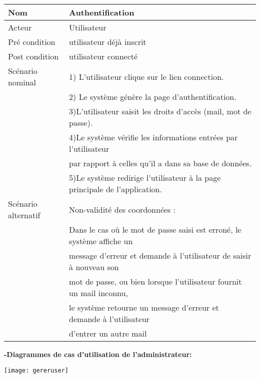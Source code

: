\documentclass[a4paper,12pt,oneside]{report}
\begin{document}
\begin{center}

\begin{tabular}{|l|l|}
  \hline
  Nom & Authentification \\
  \hline
  Acteur & Utilisateur  \\
  \hline
  Pré condition & utilisateur déjà inscrit\\
  \hline
  Post condition & utilisateur connecté  \\
  \hline
 Scénario nominal & 1) L'utilisateur clique sur le lien connection. \\ 
 & 2) Le système génère la page d'authentification. \\
 
& 3)L'utilisateur saisit les droits d'accès (mail, mot de passe). \\
& 4)Le système vérifie les informations entrées par l'utilisateur\\
& par rapport à celles qu'il a dans sa base de données. \\
& 5)Le système redirige l'utilisateur à la page principale de
l'application. \\ \hline

Scénario alternatif & Non-validité des coordonnées : \\ 
& Dans le cas où le mot de passe saisi est erroné, le système affiche un \\ &  message d'erreur et demande à  l'utilisateur de saisir à nouveau son \\
& mot de passe, ou bien lorsque l'utilisateur fournit un mail inconnu, \\ & le système retourne un message d'erreur et demande à l'utilisateur \\
& d'entrer un autre mail \\
\hline

\end{tabular}
\label{tab1}
\end{center}
\newpage
 \textbf{ -Diagrammes de cas d'utilisation de l'administrateur:}
 \begin{center}
\texttt{[image: gereruser]}
\end{center}
\end{document}
